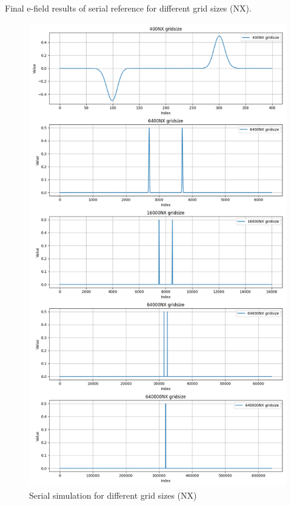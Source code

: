 \documentclass[a4paper,10pt]{article}
\begin{document}
Final e-field results of serial reference for different grid sizes (NX).
\begin{figure}[H]
  \centering
  \includegraphics[height=0.95\textheight]{../images/5_test/display_field_subplots.png}
  \caption{Serial simulation for different grid sizes (NX)}
  \label{fig:5_serial_verification}
\end{figure}


\printbibliography
\end{document}
